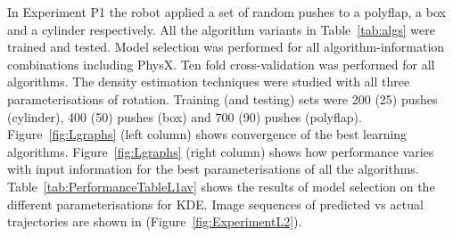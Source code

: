 In Experiment P1 the robot applied a set of random pushes to a
polyflap, a box and a cylinder respectively. All the algorithm
variants in Table~\ref{tab:algs} were trained and tested. Model
selection was performed for all algorithm-information combinations including PhysX. Ten fold cross-validation was performed for all algorithms. The density estimation techniques were studied with all three parameterisations of rotation. Training (and testing) sets were 200 (25) pushes (cylinder), 400 (50) pushes (box) and 700 (90) pushes (polyflap). Figure~\ref{fig:Lgraphs} (left column) shows convergence of the best learning algorithms. Figure~\ref{fig:Lgraphs} (right column) shows how performance varies with input information for the best parameterisations of all the algorithms. Table~\ref{tab:PerformanceTableL1av} shows the results of model selection on the different parameterisations for KDE. Image sequences of predicted vs actual trajectories are shown in (Figure~\ref{fig:ExperimentL2}).

